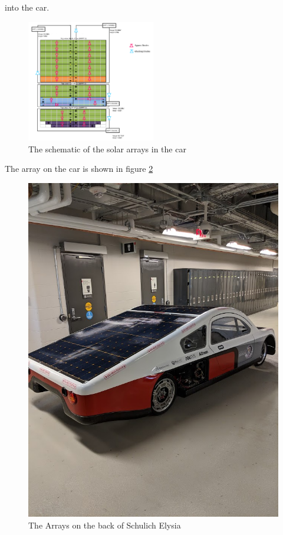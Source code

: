 \documentclass{article}
\begin{document}
    into the car.
    \begin{figure}[H]
        \centering
        \includegraphics[width=0.5\textwidth]{images/array_schem.png}
        \caption{The schematic of the solar arrays in the car}
        \label{fig:arr_schem}
    \end{figure}
    \noindent The array on the car is shown in figure \ref{fig:array}
    \begin{figure}[H]
        \centering
        \includegraphics[width=\textwidth]{images/array.jpg}
        \caption{The Arrays on the back of Schulich Elysia}
        \label{fig:array}
    \end{figure}
\end{document}
